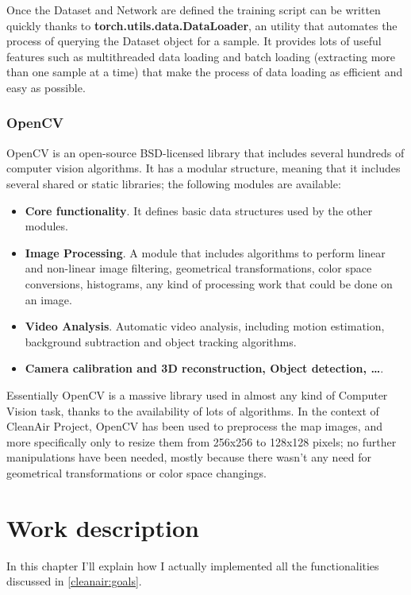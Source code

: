 \documentclass[11pt,a4paper,titlepage]{book}
\begin{document}
Once the Dataset and Network are defined the training script can be written quickly thanks to \textbf{torch.utils.data.DataLoader}, an utility that automates the process of querying the Dataset object for a sample. It provides lots of useful features such as multithreaded data loading and batch loading (extracting more than one sample at a time) that make the process of data loading as efficient and easy as possible.

\subsection{OpenCV}
\begin{figure}
    \centering
    
\end{figure}
OpenCV \cite{opencv-docs} is an open-source BSD-licensed library that includes several hundreds of computer vision algorithms. It has a modular structure, meaning that it includes several shared or static libraries; the following modules are available:
\begin{itemize}
    \item \textbf{Core functionality}. It defines basic data structures used by the other modules.
    \item \textbf{Image Processing}. A module that includes algorithms to perform linear and non-linear image filtering, geometrical transformations, color space conversions, histograms, any kind of processing work that could be done on an image.
    \item \textbf{Video Analysis}. Automatic video analysis, including motion estimation, background subtraction and object tracking algorithms.
    \item \textbf{Camera calibration and 3D reconstruction, Object detection, \dots}.
\end{itemize}
Essentially OpenCV is a massive library used in almost any kind of Computer Vision task, thanks to the availability of lots of algorithms.
\newline
\newline
In the context of CleanAir Project, OpenCV has been used to preprocess the map images, and more specifically only to resize them from 256x256 to 128x128 pixels; no further manipulations have been needed, mostly because there wasn't any need for geometrical transformations or color space changings.
\chapter{Work description}
In this chapter I'll explain how I actually implemented all the functionalities discussed in \ref{cleanair:goals}.
\end{document}
